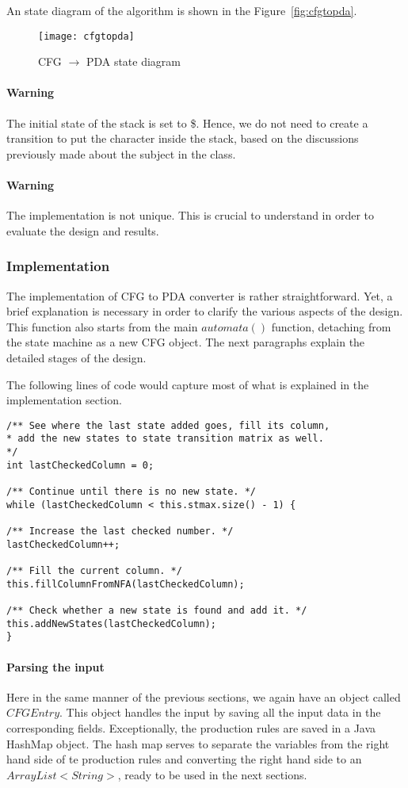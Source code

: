 \documentclass[
12pt, %
a4paper, %
oneside, %
headinclude,footinclude, %
BCOR5mm, %
]{scrartcl}
\begin{document}
An state diagram of the algorithm is shown in the Figure~\vref{fig:cfgtopda}.
\begin{figure}[tb]
	\centering 
	\texttt{[image: cfgtopda]} 
	\caption[]{CFG $ \rightarrow $ PDA state diagram}
	\label{fig:cfgtopda} 
\end{figure}


\paragraph{Warning} The initial state of the stack is set to \$. Hence, we do not need to create a transition to put the character inside the stack, based on the discussions previously made about the subject in the class.
\paragraph{Warning} The implementation is not unique. This is crucial to understand in order to evaluate the design and results.
\subsubsection{Implementation}
The implementation of CFG to PDA converter is rather straightforward. Yet, a brief explanation is necessary in order to clarify the various aspects of the design. This function also starts from the main $automata()$ function, detaching from the state machine as a new CFG object. The next paragraphs explain the detailed stages of the design.

The following lines of code would capture most of what is explained in the implementation section.

\begin{lstlisting}
/** See where the last state added goes, fill its column,
* add the new states to state transition matrix as well.
*/
int lastCheckedColumn = 0;

/** Continue until there is no new state. */
while (lastCheckedColumn < this.stmax.size() - 1) {

/** Increase the last checked number. */
lastCheckedColumn++;

/** Fill the current column. */
this.fillColumnFromNFA(lastCheckedColumn);

/** Check whether a new state is found and add it. */
this.addNewStates(lastCheckedColumn);
}
\end{lstlisting}

\paragraph{Parsing the input} Here in the same manner of the previous sections, we again have an object called $CFGEntry$. This object handles the input by saving all the input data in the corresponding fields. Exceptionally, the production rules are saved in a Java HashMap object. The hash map serves to separate the variables from the right hand side of te production rules and converting the right hand side to an $ArrayList<String>$, ready to be used in the next sections.
\end{document}
